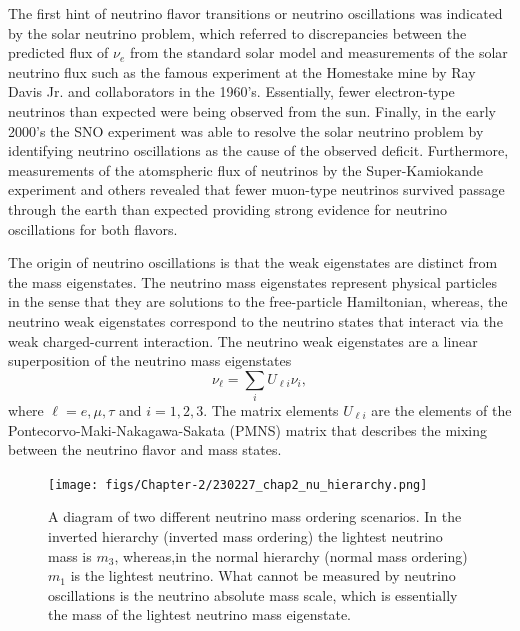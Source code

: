 The first hint of neutrino flavor transitions or neutrino oscillations was indicated by the solar neutrino problem, which referred to discrepancies between the predicted flux of $\nu_e$ from the standard solar model and measurements of the solar neutrino flux such as the famous experiment at the Homestake mine by Ray Davis Jr. and collaborators in the 1960's. Essentially, fewer electron-type neutrinos than expected were being observed from the sun. Finally, in the early 2000's the SNO experiment was able to resolve the solar neutrino problem by identifying neutrino oscillations as the cause of the observed deficit. Furthermore, measurements of the atomspheric flux of neutrinos by the Super-Kamiokande experiment and others revealed that fewer muon-type neutrinos survived passage through the earth than expected providing strong evidence for neutrino oscillations for both flavors.

The origin of neutrino oscillations is that the weak eigenstates are distinct from the mass eigenstates. The neutrino mass eigenstates represent physical particles in the sense that they are solutions to the free-particle Hamiltonian, whereas, the neutrino weak eigenstates correspond to the neutrino states that interact via the weak charged-current interaction. The neutrino weak eigenstates are a linear superposition of the neutrino mass eigenstates
\begin{equation}
    \nu_\ell=\sum_i{U_{\ell i}\nu_i},
\end{equation}
where $\ell=e,\mu,\tau$ and $i=1,2,3$. The matrix elements $U_{\ell i}$ are the elements of the Pontecorvo-Maki-Nakagawa-Sakata (PMNS) matrix that describes the mixing between the neutrino flavor and mass states.

\begin{figure}[htbp]
    \centering
    \texttt{[image: figs/Chapter-2/230227\_chap2\_nu\_hierarchy.png]}
    \caption{A diagram of two different neutrino mass ordering scenarios. In the inverted hierarchy (inverted mass ordering) the lightest neutrino mass is $m_3$, whereas,in the normal hierarchy (normal mass ordering) $m_1$ is the lightest neutrino. What cannot be measured by neutrino oscillations is the neutrino absolute mass scale, which is essentially the mass of the lightest neutrino mass eigenstate.}
    \label{fig:chap2-nu-hierarchy}
\end{figure}

